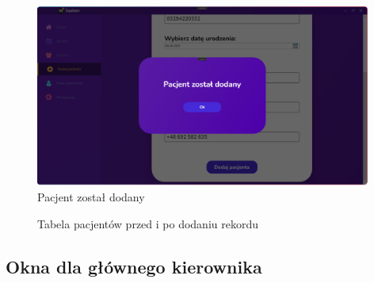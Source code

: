 \begin{flushleft}
\begin{figure}[H]
        \begin{center}
	\includegraphics[height=6cm]{images/pacj_zost_dod.png}
        \caption{Pacjent został dodany}
        \label{fig:pacj_zost_dod}
	\end{center}
    \end{figure}
    \begin{figure}[H]
    \centering
    \caption{Tabela pacjentów przed i po dodaniu rekordu}
    \end{figure}

    \subsection{\Large{Okna dla głównego kierownika}}

\end{flushleft}
